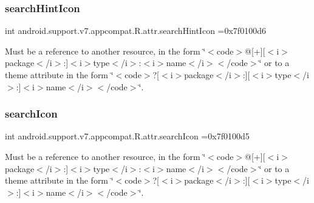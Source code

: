 \subsubsection{\texorpdfstring{search\+Hint\+Icon}{searchHintIcon}}
{\footnotesize\ttfamily int android.\+support.\+v7.\+appcompat.\+R.\+attr.\+search\+Hint\+Icon =0x7f0100d6\hspace{0.3cm}{\ttfamily [static]}}

Must be a reference to another resource, in the form \char`\"{}$<$code$>$@\mbox{[}+\mbox{]}\mbox{[}$<$i$>$package$<$/i$>$\+:\mbox{]}$<$i$>$type$<$/i$>$\+:$<$i$>$name$<$/i$>$$<$/code$>$\char`\"{} or to a theme attribute in the form \char`\"{}$<$code$>$?\mbox{[}$<$i$>$package$<$/i$>$\+:\mbox{]}\mbox{[}$<$i$>$type$<$/i$>$\+:\mbox{]}$<$i$>$name$<$/i$>$$<$/code$>$\char`\"{}. \mbox{\label{classandroid_1_1support_1_1v7_1_1appcompat_1_1R_1_1attr_a4b1621015b9ec79e6c6c880ccde1250d}} 
\subsubsection{\texorpdfstring{search\+Icon}{searchIcon}}
{\footnotesize\ttfamily int android.\+support.\+v7.\+appcompat.\+R.\+attr.\+search\+Icon =0x7f0100d5\hspace{0.3cm}{\ttfamily [static]}}

Must be a reference to another resource, in the form \char`\"{}$<$code$>$@\mbox{[}+\mbox{]}\mbox{[}$<$i$>$package$<$/i$>$\+:\mbox{]}$<$i$>$type$<$/i$>$\+:$<$i$>$name$<$/i$>$$<$/code$>$\char`\"{} or to a theme attribute in the form \char`\"{}$<$code$>$?\mbox{[}$<$i$>$package$<$/i$>$\+:\mbox{]}\mbox{[}$<$i$>$type$<$/i$>$\+:\mbox{]}$<$i$>$name$<$/i$>$$<$/code$>$\char`\"{}. \mbox{\label{classandroid_1_1support_1_1v7_1_1appcompat_1_1R_1_1attr_a3b487a2c2eeefc8dd4642311349b1a22}} 
